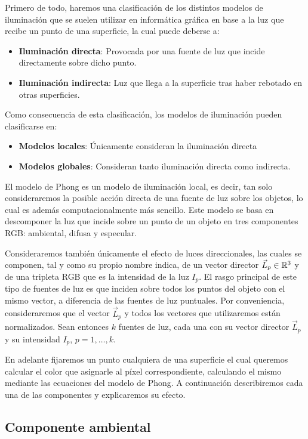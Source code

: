 Primero de todo, haremos una clasificación de los distintos modelos de iluminación que se suelen utilizar en informática gráfica en base a la luz que recibe un punto de una superficie, la cual puede deberse a:
\begin{itemize}
    \item \textbf{Iluminación directa}: Provocada por una fuente de luz que incide directamente sobre dicho punto.
    \item \textbf{Iluminación indirecta}: Luz que llega a la superficie tras haber rebotado en otras superficies.
\end{itemize}
Como consecuencia de esta clasificación, los modelos de iluminación pueden clasificarse en:
\begin{itemize}
    \item \textbf{Modelos locales}: Únicamente consideran la iluminación directa
    \item \textbf{Modelos globales}: Consideran tanto iluminación directa como indirecta.
\end{itemize}
El modelo de Phong es un modelo de iluminación local, es decir, tan solo consideraremos la posible acción directa de una fuente de luz sobre los objetos, lo cual es además computacionalmente más sencillo. Este modelo se basa en descomponer la luz que incide sobre un punto de un objeto en tres componentes RGB: ambiental, difusa y especular.

Consideraremos también únicamente el efecto de luces direccionales, las cuales se componen, tal y como su propio nombre indica, de un vector director $\vec L_p\in\mathbb{R}^3$ y de una tripleta RGB que es la intensidad de la luz $I_p$. El rasgo principal de este tipo de fuentes de luz es que inciden sobre todos los puntos del objeto con el mismo vector, a diferencia de las fuentes de luz puntuales. Por conveniencia, consideraremos que el vector $\vec L_p$ y todos los vectores que utilizaremos están normalizados. Sean entonces $k$ fuentes de luz, cada una con su vector director $\vec L_p$ y su intensidad $I_p$, $p=1,\dots,k$.

En adelante fijaremos un punto cualquiera de una superficie el cual queremos calcular el color que asignarle al píxel correspondiente, calculando el mismo mediante las ecuaciones del modelo de Phong. A continuación describiremos cada una de las componentes y explicaremos su efecto.

\subsection{Componente ambiental}

